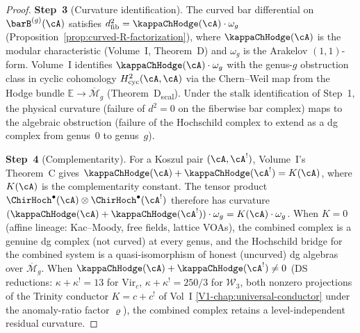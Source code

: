 \begin{proof}
\textbf{Step~3} (Curvature identification).
The curved bar differential on $\barB^{(g)}(\cA)$ satisfies
$d_{\mathrm{fib}}^2 = \kappaChHodge(\cA) \cdot \omega_g$
(Proposition~\ref{prop:curved-R-factorization}), where
$\kappaChHodge(\cA)$ is the modular characteristic (Volume~I,
Theorem~D) and $\omega_g$ is the Arakelov $(1,1)$-form.
Volume~I identifies $\kappaChHodge(\cA) \cdot \omega_g$ with the
genus-$g$ obstruction class in cyclic cohomology
$H^2_{\mathrm{cyc}}(\cA, \cA)$ via the Chern--Weil map
from the Hodge bundle $\mathbb{E} \to \overline{\mathcal{M}}_g$
(Theorem~D\textsubscript{scal}).
Under the stalk identification of Step~1, the physical curvature
(failure of $d^2 = 0$ on the fiberwise bar complex) maps to the
algebraic obstruction (failure of the Hochschild complex to
extend as a dg complex from genus~$0$ to genus~$g$).

\textbf{Step~4} (Complementarity).
For a Koszul pair $(\cA, \cA^!)$, Volume~I's Theorem~C gives
$\kappaChHodge(\cA) + \kappaChHodge(\cA^!) = K(\cA)$, where $K(\cA)$ is
the complementarity constant. The tensor product
$\ChirHoch^\bullet(\cA) \otimes \ChirHoch^\bullet(\cA^!)$
therefore has curvature
$(\kappaChHodge(\cA) + \kappaChHodge(\cA^!)) \cdot \omega_g
= K(\cA) \cdot \omega_g$.
When $K = 0$ (affine lineage: Kac--Moody, free fields, lattice
VOAs), the combined complex is a genuine dg complex (not curved)
at every genus, and the Hochschild bridge for the combined system
is a quasi-isomorphism of honest (uncurved) dg algebras
over $\overline{\mathcal{M}}_g$. When $\kappaChHodge(\cA) + \kappaChHodge(\cA^{!}) \neq 0$ (DS reductions:
$\kappa + \kappa^{!} = 13$ for $\mathrm{Vir}_c$,
$\kappa + \kappa^{!} = 250/3$ for $\mathcal{W}_3$, both nonzero
projections of the Trinity conductor $K = c + c^{!}$ of Vol~I
\cref{V1-chap:universal-conductor} under the anomaly-ratio factor
$\varrho$), the combined complex retains a level-independent
residual curvature.
\end{proof}

